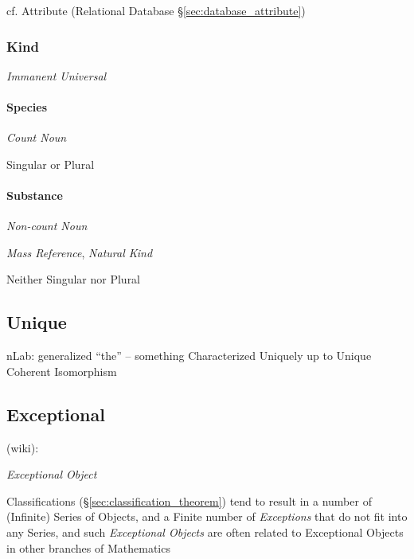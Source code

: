 \fist cf. Attribute (Relational Database \S\ref{sec:database_attribute})



\subsubsection{Kind}\label{sec:universal_kind}

\emph{Immanent Universal}



\paragraph{Species}\label{sec:species}\hfill

\emph{Count Noun}

Singular or Plural



\paragraph{Substance}\label{sec:substance}\hfill

\emph{Non-count Noun}

\emph{Mass Reference}, \emph{Natural Kind}

Neither Singular nor Plural



\subsection{Unique}\label{sec:unique}

nLab: generalized ``the'' -- something Characterized Uniquely up to
Unique Coherent Isomorphism %



\subsection{Exceptional}\label{sec:exceptional}

(wiki):

\emph{Exceptional Object}

Classifications (\S\ref{sec:classification_theorem}) tend to result in a number
of (Infinite) Series of Objects, and a Finite number of \emph{Exceptions} that
do not fit into any Series, and such \emph{Exceptional Objects} are often
related to Exceptional Objects in other branches of Mathematics

